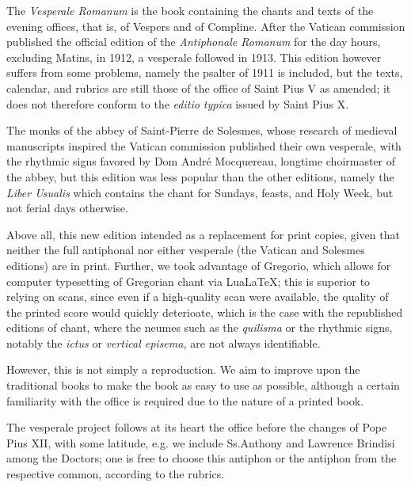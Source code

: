 

\begin{enpars}
The \textit{Vesperale Romanum} is the book containing the chants and texts of the evening offices, that is, of Vespers and of Compline. After the Vatican commission published the official edition of the \textit{Antiphonale Romanum} for the day hours, excluding Matins, in 1912, a vesperale followed in 1913. This edition however suffers from some problems, namely the psalter of 1911 is included, but the texts, calendar, and rubrics are still those of the office of Saint Pius V as amended; it does not therefore conform to the \textit{editio typica} issued by Saint Pius X.

The monks of the abbey of Saint-Pierre de Solesmes, whose research of medieval manuscripts inspired the Vatican commission published their own vesperale, with the rhythmic signs favored by Dom André Mocquereau, longtime choirmaster of the abbey, but this edition was less popular than the other editions, namely the \textit{Liber Usualis} which contains the chant for Sundays, feasts, and Holy Week, but not ferial days otherwise.


Above all, this new edition intended as a replacement for print copies, given that neither the full antiphonal nor either vesperale (the Vatican and Solesmes editions) are in print. Further, we took advantage of Gregorio, which allows for computer typesetting of Gregorian chant via LuaLaTeX; this is superior to relying on scans, since even if a high-quality scan were available, the quality of the printed score would quickly deterioate, which is the case with the republished editions of chant, where the neumes such as the \textit{quilisma} or the rhythmic signs, notably the \textit{ictus} or \textit{vertical episema,} are not always identifiable.

However, this is not simply a reproduction. We aim to improve upon the traditional books to make the book as easy to use as possible, although a certain familiarity with the office is required due to the nature of a printed book.


The vesperale project follows at its heart the office before the changes of Pope Pius XII, with some latitude, e.g. we include Ss.\@ Anthony and Lawrence Brindisi among the Doctors; one is free to choose this antiphon or the antiphon from the respective common, according to the rubrics.


\end{enpars}
